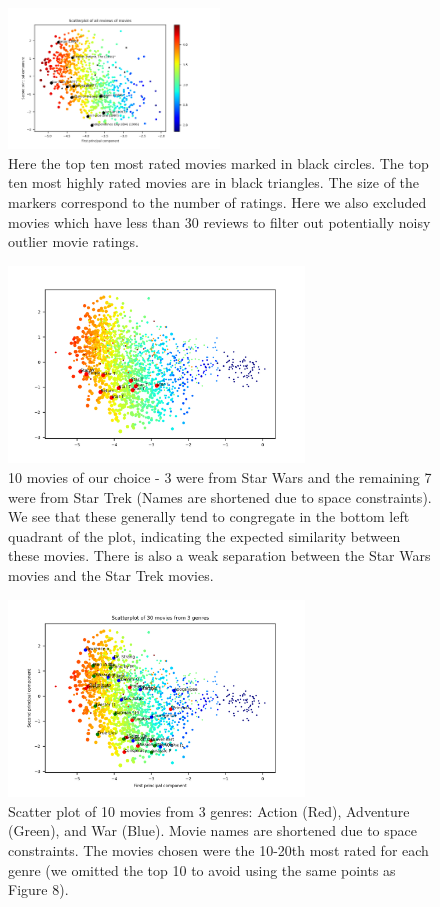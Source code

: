 \documentclass{article}
\begin{document}
\begin{figure}[H]
	\centering
	\includegraphics[width=0.5\textwidth]{Scores30Labelled.png}
	\caption{Here the top ten most rated movies marked in black circles. The top ten most highly rated movies are in black triangles. The size of the markers correspond to the number of ratings. Here we also excluded movies which have less than 30 reviews to filter out potentially noisy outlier movie ratings.
	}
\end{figure}

\begin{figure}[H]
	\centering
	\includegraphics[width=0.7\textwidth]{Star.png}
	\caption{10 movies of our choice - 3 were from Star Wars and the remaining 7 were from Star Trek (Names are shortened due to space constraints). We see that these generally tend to congregate in the bottom left quadrant of the plot, indicating the expected similarity between these movies. There is also a weak separation between the Star Wars movies and the Star Trek movies.
	}
\end{figure}

\begin{figure}[H]
	\centering
	\includegraphics[width=0.7\textwidth]{3Genres.png}
	\caption{Scatter plot of 10 movies from 3 genres: Action (Red), Adventure (Green), and War (Blue). Movie names are shortened due to space constraints. The movies chosen were the 10-20th most rated for each genre (we omitted the top 10 to avoid using the same points as Figure 8). 
	}
\end{figure}
\end{document}
